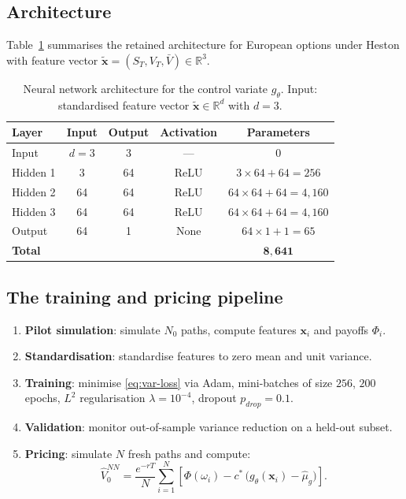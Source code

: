 \documentclass[12pt, a4paper]{report}
\theoremstyle{definition}
\newcommand{\R}{\mathbb{R}}
\begin{document}
\subsection{Architecture}

Table~\ref{tab:nn-architecture} summarises the retained architecture
for European options under Heston with feature vector
$\tilde{\mathbf{x}} = (S_T, V_T, \bar{V}) \in \R^3$.

\begin{table}[H]
\centering
\caption{Neural network architecture for the control variate
         $g_\theta$.  Input: standardised feature vector
         $\tilde{\mathbf{x}} \in \R^d$ with $d = 3$.}
\label{tab:nn-architecture}
\renewcommand{\arraystretch}{1.4}
\begin{tabular}{lcccc}
\toprule
\textbf{Layer} & \textbf{Input} & \textbf{Output}
               & \textbf{Activation} & \textbf{Parameters} \\
\midrule
Input    & $d = 3$ & 3  & ---  & 0 \\
Hidden 1 & 3       & 64 & ReLU & $3 \times 64 + 64 = 256$ \\
Hidden 2 & 64      & 64 & ReLU & $64 \times 64 + 64 = 4{,}160$ \\
Hidden 3 & 64      & 64 & ReLU & $64 \times 64 + 64 = 4{,}160$ \\
Output   & 64      & 1  & None & $64 \times 1 + 1 = 65$ \\
\midrule
\textbf{Total} & & & & $\mathbf{8{,}641}$ \\
\bottomrule
\end{tabular}
\end{table}

\subsection{The training and pricing pipeline}

\begin{enumerate}
    \item \textbf{Pilot simulation}: simulate $N_0$ paths, compute
          features $\mathbf{x}_i$ and payoffs $\Phi_i$.
    \item \textbf{Standardisation}: standardise features to zero mean
          and unit variance.
    \item \textbf{Training}: minimise \eqref{eq:var-loss} via Adam,
          mini-batches of size $256$, $200$ epochs, $L^2$
          regularisation $\lambda = 10^{-4}$, dropout $p_{drop} = 0.1$.
    \item \textbf{Validation}: monitor out-of-sample variance reduction
          on a held-out subset.
    \item \textbf{Pricing}: simulate $N$ fresh paths and compute:
\begin{equation}
    \hat{V}_0^{NN} = \frac{e^{-rT}}{N}\sum_{i=1}^{N}
    \left[\Phi(\omega_i) - c^*\,
    \bigl(g_\theta(\mathbf{x}_i) - \hat{\mu}_{g}\bigr)\right].
    \label{eq:nn-cv-estimator}
\end{equation}
\end{enumerate}
\end{document}
